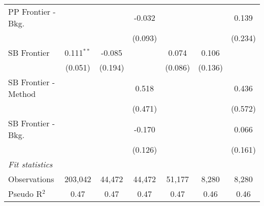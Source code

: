\begin{tabular}{lcccccc}
   PP Frontier - Bkg.   &               &               & -0.032        &               &               & 0.139\\   
                        &               &               & (0.093)       &               &               & (0.234)\\   
   SB Frontier          & 0.111$^{**}$  & -0.085        &               & 0.074         & 0.106         &   \\   
                        & (0.051)       & (0.194)       &               & (0.086)       & (0.136)       &   \\   
   SB Frontier - Method &               &               & 0.518         &               &               & 0.436\\   
                        &               &               & (0.471)       &               &               & (0.572)\\   
   SB Frontier - Bkg.   &               &               & -0.170        &               &               & 0.066\\   
                        &               &               & (0.126)       &               &               & (0.161)\\   
   \midrule
   \emph{Fit statistics}\\
   Observations         & 203,042       & 44,472        & 44,472        & 51,177        & 8,280         & 8,280\\  
   Pseudo R$^2$         & 0.47          & 0.47          & 0.47          & 0.47          & 0.46          & 0.46\\  
   

\end{tabular}
